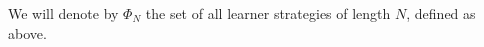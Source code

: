 \documentclass[final,12pt]{colt2018}
\def\N{\mathbb{N}}
\def\red#1{{\color{red} #1}}
\def\tr#1{\red{[Comments: #1 ]}}
\begin{document}
We will denote by $\Phi_N$  the set of all {learner} strategies of length $N$, defined as above.


\end{document}
